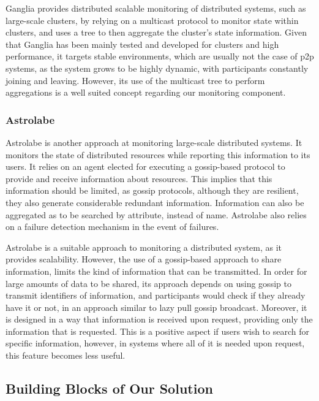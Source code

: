Ganglia provides distributed scalable monitoring of distributed systems, such as large-scale clusters, by relying on a multicast protocol to monitor state within clusters, and uses a tree to then aggregate the cluster's state information. Given that Ganglia has been mainly tested and developed for clusters and high performance, it targets stable environments, which are usually not the case of \gls{p2p} systems, as the system grows to be highly dynamic, with participants constantly joining and leaving. However, its use of the multicast tree to perform aggregations is a well suited concept regarding our monitoring component.

\subsubsection{Astrolabe}
\label{sssec:astrolabe}

Astrolabe\cite{VanRenesse2003} is another approach at monitoring large-scale distributed systems. It monitors the state of distributed resources while reporting this information to its users. It relies on an agent elected for executing a gossip-based protocol to provide and receive information about resources. This implies that this information should be limited, as gossip protocols, although they are resilient, they also generate considerable redundant information. Information can also be aggregated as to be searched by attribute, instead of name. Astrolabe also relies on a failure detection mechanism in the event of failures.

Astrolabe is a suitable approach to monitoring a distributed system, as it provides scalability. However, the use of a gossip-based approach to share information, limits the kind of information that can be transmitted. In order for large amounts of data to be shared, its approach depends on using gossip to transmit identifiers of information, and participants would check if they already have it or not, in an approach similar to lazy pull gossip broadcast. Moreover, it is designed in a way that information is received upon request, providing only the information that is requested. This is a positive aspect if users wish to search for specific information, however, in systems where all of it is needed upon request, this feature becomes less useful.

\subsection{Building Blocks of Our Solution}
\label{ssec:building_blocks_of_our_solution}

